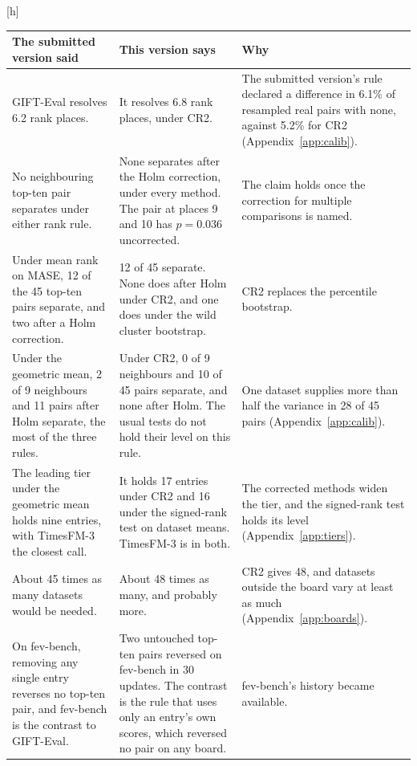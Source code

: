 \documentclass{article}
\makeatletter
\renewenvironment{table}
  {\setlength{\abovecaptionskip}{6\p@}%
   \setlength{\belowcaptionskip}{\z@}%
   \@float{table}}
  {\end@float}
\makeatother
\begin{document}
\begin{table}[h]
\centering
\scriptsize
\setlength{\tabcolsep}{4pt}
\begin{tabular}{@{}p{4.1cm}p{4.9cm}p{4.3cm}@{}}
\toprule
\textbf{The submitted version said} & \textbf{This version says} & \textbf{Why} \\
\midrule
GIFT-Eval resolves 6.2 rank places. &
It resolves 6.8 rank places, under CR2. &
The submitted version's rule declared a difference in 6.1\% of resampled real pairs with none,
against 5.2\% for CR2 (Appendix~\ref{app:calib}). \\
\addlinespace[2pt]
No neighbouring top-ten pair separates under either rank rule. &
None separates after the Holm correction, under every method. The pair at places 9 and 10 has
$p = 0.036$ uncorrected. &
The claim holds once the correction for multiple comparisons is named. \\
\addlinespace[2pt]
Under mean rank on MASE, 12 of the 45 top-ten pairs separate, and two after a Holm correction. &
12 of 45 separate. None does after Holm under CR2, and one does under the wild cluster
bootstrap. &
CR2 replaces the percentile bootstrap. \\
\addlinespace[2pt]
Under the geometric mean, 2 of 9 neighbours and 11 pairs after Holm separate, the most of the
three rules. &
Under CR2, 0 of 9 neighbours and 10 of 45 pairs separate, and none after Holm. The usual tests
do not hold their level on this rule. &
One dataset supplies more than half the variance in 28 of 45 pairs
(Appendix~\ref{app:calib}). \\
\addlinespace[2pt]
The leading tier under the geometric mean holds nine entries, with TimesFM-3 the closest call. &
It holds 17 entries under CR2 and 16 under the signed-rank test on dataset means. TimesFM-3 is
in both. &
The corrected methods widen the tier, and the signed-rank test holds its level
(Appendix~\ref{app:tiers}). \\
\addlinespace[2pt]
About 45 times as many datasets would be needed. &
About 48 times as many, and probably more. &
CR2 gives 48, and datasets outside the board vary at least as much
(Appendix~\ref{app:boards}). \\
\addlinespace[2pt]
On fev-bench, removing any single entry reverses no top-ten pair, and fev-bench is the contrast
to GIFT-Eval. &
Two untouched top-ten pairs reversed on fev-bench in 30 updates. The contrast is the rule that
uses only an entry's own scores, which reversed no pair on any board. &
fev-bench's history became available. \\

\end{tabular}
\end{table}
\end{document}
